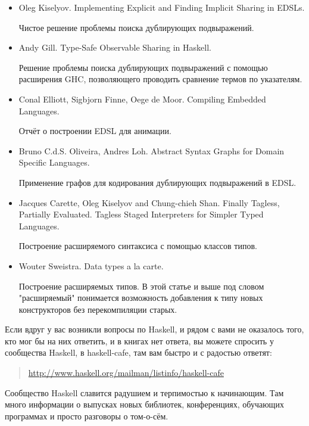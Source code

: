 \begin{itemize}

\item Oleg Kiselyov. Implementing Explicit and Finding 
    Implicit Sharing in EDSLs.

    Чистое решение проблемы поиска дублирующих подвыражений.

\item Andy Gill. Type-Safe Observable Sharing in Haskell. 

    Решение проблемы поиска дублирующих подвыражений с
    помощью расширения GHC, позволяющего проводить сравнение
    термов по указателям.

\item Conal Elliott, Sigbjorn Finne, Oege de Moor. 
    Compiling Embedded Languages. 

    Отчёт о построении EDSL для анимации. 

\item Bruno C.d.S. Oliveira, Andres Loh. 
    Abstract Syntax Graphs for Domain Specific Languages.

    Применение графов для кодирования дублирующих
    подвыражений в EDSL.
    
\item Jacques Carette, Oleg Kiselyov and Chung-chieh Shan.
    Finally Tagless, Partially Evaluated. 
    Tagless Staged Interpreters for Simpler Typed Languages.

    Построение расширяемого синтаксиса с помощью 
    классов типов.

\item Wouter Sweistra. Data types a la carte.

    Построение расширяемых типов. В этой статье и выше
    под словом "расширяемый" понимается возможность
    добавления к типу новых конструкторов без перекомпиляции
    старых.  

\end{itemize}


Если вдруг у вас возникли вопросы по Haskell, и рядом с вами не оказалось
того, кто мог бы на них ответить, и в книгах нет ответа, вы 
можете спросить у сообщества Haskell,
в haskell-cafe, там вам быстро и с радостью ответят:

\begin{quote}
\url{http://www.haskell.org/mailman/listinfo/haskell-cafe}
\end{quote}

Сообщество Haskell славится радушием и терпимостью 
к начинающим. Там много информации о выпусках новых библиотек,
конференциях, обучающих программах и просто разговоры о том-о-сём.


